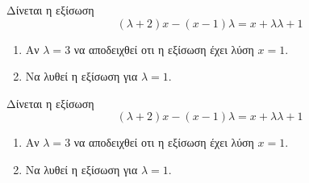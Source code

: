 Δίνεται η εξίσωση \[ (\lambda+2)x-(x-1)\lambda=x+\lambda\lambda+1 \]
\begin{enumerate}[label=\roman*.,itemsep=0mm]
\item Αν $ \lambda=3 $ να αποδειχθεί οτι η εξίσωση έχει λύση $ x=1 $.
\item Να λυθεί η εξίσωση για $ \lambda=1 $.
\end{enumerate}
Δίνεται η εξίσωση \[ (\lambda+2)x-(x-1)\lambda=x+\lambda\lambda+1 \]
\begin{enumerate}[label=\roman*.,itemsep=0mm]
\item Αν $ \lambda=3 $ να αποδειχθεί οτι η εξίσωση έχει λύση $ x=1 $.
\item Να λυθεί η εξίσωση για $ \lambda=1 $.
\end{enumerate}
